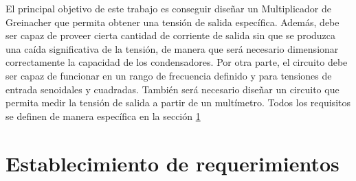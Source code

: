 El principal objetivo de este trabajo es conseguir diseñar un Multiplicador de Greinacher que permita obtener una tensión de salida específica.
Además, debe ser capaz de proveer cierta cantidad de corriente de salida sin que se produzca una caída significativa de la tensión, de manera que será
necesario dimensionar correctamente la capacidad de los condensadores. Por otra parte, el circuito debe ser capaz de funcionar en un rango de frecuencia definido
y para tensiones de entrada senoidales y cuadradas. También será necesario diseñar un circuito que permita medir la tensión de salida a partir de un multímetro.
Todos los requisitos se definen de manera específica en la sección \ref{requisitos}

\section{Establecimiento de requerimientos} \label{requisitos}